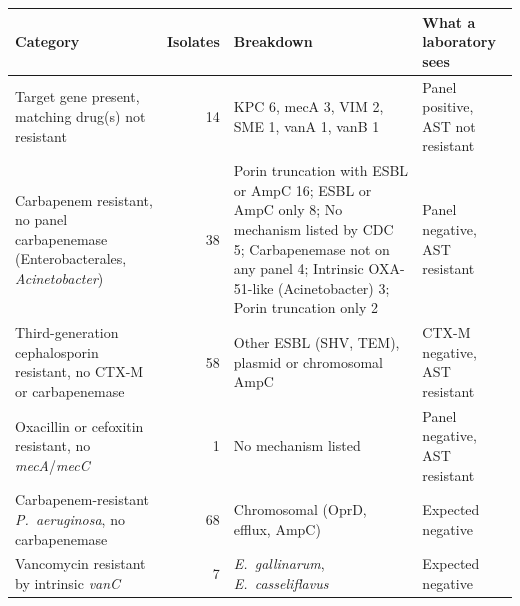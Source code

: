 \begin{tabularx}{\textwidth}{@{}>{\raggedright\arraybackslash}p{}r>{\raggedright\arraybackslash}X>{\raggedright\arraybackslash}p{}@{}}
\toprule
Category & Isolates & Breakdown & What a laboratory sees \\
\midrule
Target gene present, matching drug(s) not resistant & 14 & KPC 6, mecA 3, VIM 2, SME 1, vanA 1, vanB 1 & Panel positive, AST not resistant \\
Carbapenem resistant, no panel carbapenemase (Enterobacterales, \textit{Acinetobacter}) & 38 & Porin truncation with ESBL or AmpC 16; ESBL or AmpC only 8; No mechanism listed by CDC 5; Carbapenemase not on any panel 4; Intrinsic OXA-51-like (Acinetobacter) 3; Porin truncation only 2 & Panel negative, AST resistant \\
Third-generation cephalosporin resistant, no CTX-M or carbapenemase & 58 & Other ESBL (SHV, TEM), plasmid or chromosomal AmpC & CTX-M negative, AST resistant \\
Oxacillin or cefoxitin resistant, no \textit{mecA}/\textit{mecC} & 1 & No mechanism listed & Panel negative, AST resistant \\
Carbapenem-resistant \textit{P.~aeruginosa}, no carbapenemase & 68 & Chromosomal (OprD, efflux, AmpC) & Expected negative \\
Vancomycin resistant by intrinsic \textit{vanC} & 7 & \textit{E.~gallinarum}, \textit{E.~casseliflavus} & Expected negative \\
\bottomrule
\end{tabularx}
